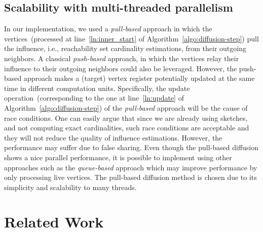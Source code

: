 \documentclass[final,5p,times,twocolumn]{elsarticle}
\newcommand\acro{{\sc{HyperFuseR\xspace}\xspace}\xspace}
\begin{document}
\subsection{Scalability with multi-threaded parallelism}


In our implementation, we used a {\em pull-based} approach in which the vertices~(processed at line~\ref{ln:inner_start} of Algorithm~\ref{algo:diffusion-step}) pull the influence, i.e., reachability set cardinality estimations, from their outgoing neighbors. A classical {\em push-based} approach, in which the vertices relay their influence to their outgoing neighbors could also be leveraged. However, the push-based approach makes a (target) vertex register potentially updated at the same time in different computation units. Specifically, the update operation~(corresponding to the one at line~\ref{ln:update} of Algorithm~\ref{algo:diffusion-step}) of the {\em pull-based} approach will be the cause of race conditions. One can easily argue that since we are already using sketches, and not computing exact cardinalities, such race conditions are acceptable and they will not reduce the quality of influence estimations. However, the performance may suffer due to false sharing. 
Even though the pull-based diffusion shows a nice parallel performance, it is possible to implement \acro using other approaches such as the {\em queue-based} approach which may improve performance by only processing live vertices. The pull-based diffusion method is chosen due to its simplicity and scalability to many threads.

\section{Related Work}\label{sec:relatedwork}
\end{document}
